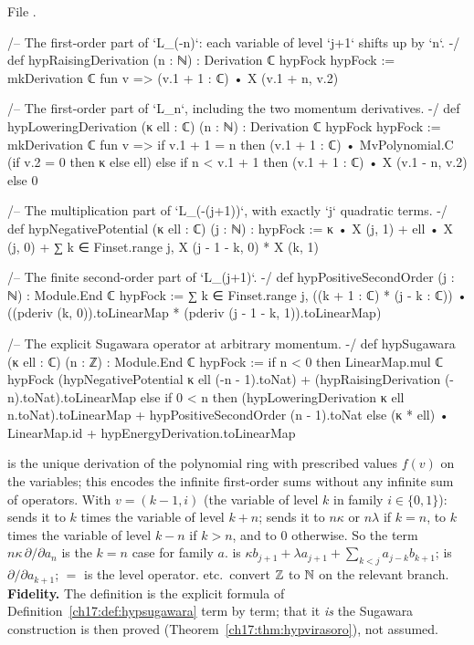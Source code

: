 \noindent File .
\begin{leancode}
/-- The first-order part of `L_(-n)`: each variable of level `j+1` shifts up by `n`. -/
def hypRaisingDerivation (n : ℕ) : Derivation ℂ hypFock hypFock :=
  mkDerivation ℂ fun v => (v.1 + 1 : ℂ) • X (v.1 + n, v.2)

/-- The first-order part of `L_n`, including the two momentum derivatives. -/
def hypLoweringDerivation (κ ell : ℂ) (n : ℕ) : Derivation ℂ hypFock hypFock :=
  mkDerivation ℂ fun v =>
    if v.1 + 1 = n then (v.1 + 1 : ℂ) • MvPolynomial.C (if v.2 = 0 then κ else ell)
    else if n < v.1 + 1 then (v.1 + 1 : ℂ) • X (v.1 - n, v.2)
    else 0

/-- The multiplication part of `L_(-(j+1))`, with exactly `j` quadratic terms. -/
def hypNegativePotential (κ ell : ℂ) (j : ℕ) : hypFock :=
  κ • X (j, 1) + ell • X (j, 0) +
    ∑ k ∈ Finset.range j, X (j - 1 - k, 0) * X (k, 1)

/-- The finite second-order part of `L_(j+1)`. -/
def hypPositiveSecondOrder (j : ℕ) : Module.End ℂ hypFock :=
  ∑ k ∈ Finset.range j, ((k + 1 : ℂ) * (j - k : ℂ)) •
    ((pderiv (k, 0)).toLinearMap * (pderiv (j - 1 - k, 1)).toLinearMap)

/-- The explicit Sugawara operator at arbitrary momentum. -/
def hypSugawara (κ ell : ℂ) (n : ℤ) : Module.End ℂ hypFock :=
  if n < 0 then
    LinearMap.mul ℂ hypFock (hypNegativePotential κ ell (-n - 1).toNat) +
      (hypRaisingDerivation (-n).toNat).toLinearMap
  else if 0 < n then
    (hypLoweringDerivation κ ell n.toNat).toLinearMap +
      hypPositiveSecondOrder (n - 1).toNat
  else (κ * ell) • LinearMap.id + hypEnergyDerivation.toLinearMap
\end{leancode}

\begin{dictionary}
 is the unique derivation of the polynomial ring with prescribed values $f(v)$ on
the variables; this encodes the infinite first-order sums without any infinite sum of operators.  With
$v=(k-1,i)$ (the variable of level $k$ in family $i\in\{0,1\}$):  sends it to $k$ times the
variable of level $k+n$;  sends it to $n\kappa$ or $n\lambda$ if $k=n$, to $k$ times
the variable of level $k-n$ if $k>n$, and to $0$ otherwise.  So the term $n\kappa\,\partial/\partial a_n$ is the
$k=n$ case for family $a$.   is $\kappa b_{j+1}+\lambda a_{j+1}+\sum_{k<j}a_{j-k}b_{k+1}$;
 is $\partial/\partial a_{k+1}$;  $=$  is the
level operator.   etc.\ convert ${\mathbb{Z}}$ to ${\mathbb{N}}$ on the relevant branch.  \textbf{Fidelity.} The
definition is the explicit formula of Definition~\ref{ch17:def:hypsugawara} term by term; that it \emph{is} the
Sugawara construction is then proved (Theorem~\ref{ch17:thm:hypvirasoro}), not assumed.
\end{dictionary}

